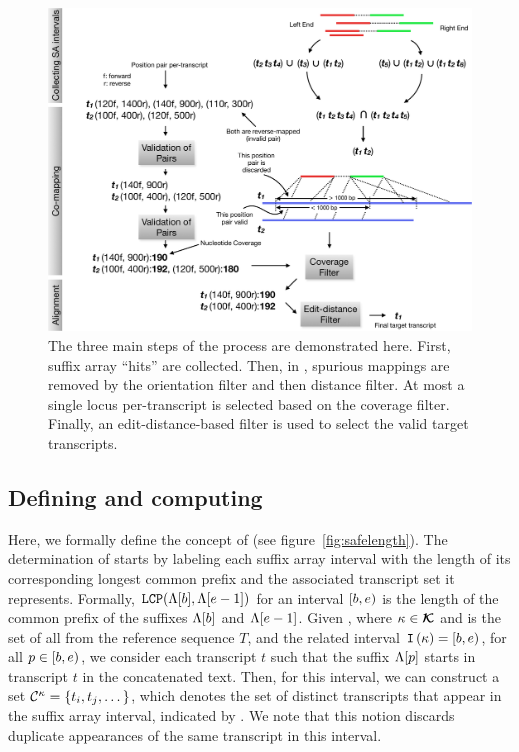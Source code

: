 \begin{figure}[h]
 \centering
 \includegraphics[scale=0.3]{Figures/sla/overview}
 \caption[The main steps of the \sla process]{The three main steps of the \sla 
 process are demonstrated here. First, suffix array ``hits'' are collected. Then, 
 in \cm, spurious mappings are removed by the orientation filter and then distance 
 filter. At most a single locus per-transcript is selected based on the coverage filter. 
 Finally, an edit-distance-based filter is used to select the valid target transcripts.
 }
  \label{fig:block_overview}
\end{figure}

\subsection{Defining and computing \kslcps}\label{sec:safelength}
Here, we formally define the concept of \kslcps (see figure~\cref{fig:safelength}). 
The determination of \kslcps starts by labeling each suffix array interval with the 
length of its corresponding longest common prefix and the associated transcript set it 
represents. Formally, $\texttt{LCP}(\Lambda{[b]}, \Lambda{[e-1]})$ for an interval 
$\left[b,e\right)$ is the length of the common prefix of the suffixes $\Lambda{[b]}$ 
and $\Lambda{[e-1]}$. Given \kmer \samplekmer, where ${\kappa} \in \bm{\mathcal{K}}$ 
and \allkmers is the set of all \kmers from the reference sequence $T$, and the related 
interval $\texttt{I}\left({\kappa}\right) = \left[b,e\right)$, for all $p \in \left[b,e\right)$, we 
consider each transcript $t$ such that the suffix $\Lambda{[p]}$ starts in transcript 
$t$ in the concatenated text. Then, for this interval, we can construct a set 
$\mathcal{C}^{{\kappa}} =  \{t_{i}, t_{j}, \dots\}$, which denotes the set of distinct 
transcripts that appear in the suffix array interval, indicated by \samplekmer.  We note 
that this notion discards duplicate appearances of the same transcript in this interval.

